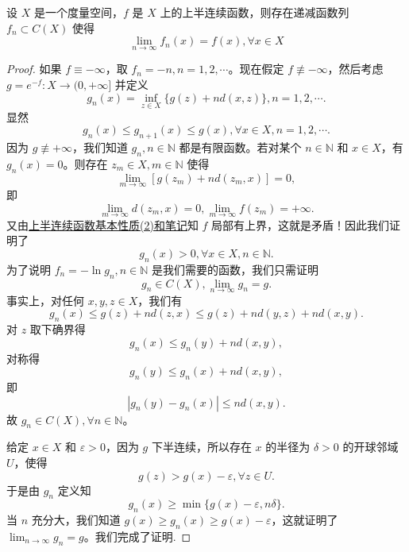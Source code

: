 \documentclass[../../main.tex]{subfiles}%
\begin{document}
\begin{theorem}[半连续函数逼近定理]\label{theorem:半连续函数逼近定理}
设 \(X\) 是一个度量空间，\(f\) 是 \(X\) 上的上半连续函数，则存在递减函数列 \(f_{n} \subset C(X)\) 使得
\[
\lim_{n \to \infty} f_{n}(x)=f(x),\forall x \in X
\]
\end{theorem}
\begin{proof}
如果 \(f\equiv -\infty\)，取 \(f_{n}=-n,n = 1,2,\cdots\)。现在假定 \(f\not\equiv -\infty\)，然后考虑 \(g = e^{-f}:X\to(0,+\infty]\) 并定义
\[
g_{n}(x)=\inf_{z\in X}\{g(z)+nd(x,z)\},n = 1,2,\cdots.
\]
显然
\[
g_{n}(x)\leqslant  g_{n + 1}(x)\leqslant  g(x),\forall x\in X,n = 1,2,\cdots.
\]
因为 \(g\not\equiv+\infty\)，我们知道 \(g_{n},n\in\mathbb{N}\) 都是有限函数。若对某个 \(n\in\mathbb{N}\) 和 \(x\in X\)，有 \(g_{n}(x)=0\)。则存在 \(z_{m}\in X,m\in\mathbb{N}\) 使得
\[
\lim_{m\to\infty}[g(z_{m})+nd(z_{m},x)] = 0,
\]
即
\[
\lim_{m\to\infty}d(z_{m},x)=0,\lim_{m\to\infty}f(z_{m})=+\infty.
\]
又由\hyperref[proposition:半连续函数基本性质]{上半连续函数基本性质(2)和笔记}知 \(f\) 局部有上界，这就是矛盾！因此我们证明了
\[
g_{n}(x)>0,\forall x\in X,n\in\mathbb{N}.
\]
为了说明 \(f_{n}=-\ln g_{n},n\in\mathbb{N}\) 是我们需要的函数，我们只需证明
\[
g_{n}\in C(X),\lim_{n\to\infty}g_{n}=g.
\]
事实上，对任何 \(x,y,z\in X\)，我们有
\[
g_{n}(x)\leqslant  g(z)+nd(z,x)\leqslant  g(z)+nd(y,z)+nd(x,y).
\]
对 \(z\) 取下确界得
\[
g_{n}(x)\leqslant  g_{n}(y)+nd(x,y),
\]
对称得
\[
g_{n}(y)\leqslant  g_{n}(x)+nd(x,y),
\]
即
\[
|g_{n}(y)-g_{n}(x)|\leqslant  nd(x,y).
\]
故 \(g_{n}\in C(X),\forall n\in\mathbb{N}\)。

给定 \(x\in X\) 和 \(\varepsilon>0\)，因为 \(g\) 下半连续，所以存在 \(x\) 的半径为 \(\delta>0\) 的开球邻域 \(U\)，使得
\[
g(z)>g(x)-\varepsilon,\forall z\in U.
\]
于是由 \(g_{n}\) 定义知
\[
g_{n}(x)\geqslant \min\{g(x)-\varepsilon,n\delta\}.
\]
当 \(n\) 充分大，我们知道 \(g(x)\geqslant  g_{n}(x)\geqslant  g(x)-\varepsilon\)，这就证明了 \(\lim_{n\to\infty}g_{n}=g\)。我们完成了证明.
\end{proof}
\end{document}

